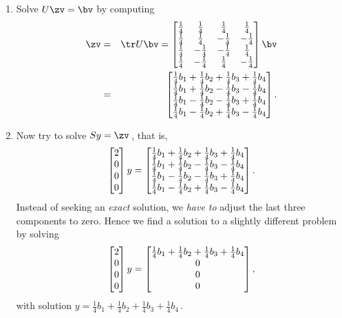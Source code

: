 \begin{reduce}
\begin{example}
\begin{enumerate}
\item Solve \(U\zv=\bv\) by computing 
\begin{eqnarray*}
\zv&=&\tr U\bv
=\begin{bmatrix} 
  \h&\h&\h&\h
\\\h&\h&-\h&-\h
\\\h&-\h&-\h&\h
\\\h&-\h&\h&-\h \end{bmatrix}\bv
\\&=&\begin{bmatrix} \h b_1+\h b_2+\h b_3+\h b_4
\\\h b_1+\h b_2-\h b_3-\h b_4
\\\h b_1-\h b_2-\h b_3+\h b_4
\\\h b_1-\h b_2+\h b_3-\h b_4 \end{bmatrix}.
\end{eqnarray*}

\item  Now try to solve \(Sy=\zv\)\,, that is,
\begin{equation*}
\begin{bmatrix} 2\\0\\0\\0 \end{bmatrix}y
=\begin{bmatrix} \h b_1+\h b_2+\h b_3+\h b_4
\\\h b_1+\h b_2-\h b_3-\h b_4
\\\h b_1-\h b_2-\h b_3+\h b_4
\\\h b_1-\h b_2+\h b_3-\h b_4 \end{bmatrix}.
\end{equation*}
Instead of seeking an \emph{exact} solution,  we \emph{have to} adjust the last three components to zero. 
Hence we find a solution to a slightly different problem by solving
\begin{equation*}
\begin{bmatrix} 2\\0\\0\\0 \end{bmatrix}y
=\begin{bmatrix} \h b_1+\h b_2+\h b_3+\h b_4\\0\\0\\0 \end{bmatrix},
\end{equation*}
\def\h{\frac14}%
with solution \(y=\h b_1+\h b_2+\h b_3+\h b_4\)\,.


\end{enumerate}
\end{example}
\end{reduce}
